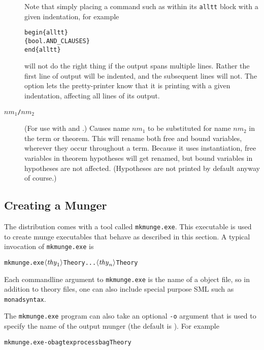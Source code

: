 \begin{description}
  Note that simply placing a command such as \holthm{} within its \texttt{alltt} block with a given indentation, for example
\begin{alltt}
   \bs{}begin\{alltt\}
      \holthm\{bool.AND_CLAUSES\}
   \bs{}end\{alltt\}
\end{alltt}
will not do the right thing if the output spans multiple lines.
%
Rather the first line of \HOL{} output will be indented, and the subsequent lines will not.
%
The \texttt{\indentoption} option lets the pretty-printer know that it is printing with a given indentation, affecting all lines of its output.


\item[$\mathit{nm}_1$\texttt{/}$\mathit{nm}_2$] (For use with \holtm{}
  and \holthm{}.)
%
Causes name $\mathit{nm}_1$ to be substituted for name $\mathit{nm}_2$ in the term or theorem.
%
This will rename both free and bound variables, wherever they occur throughout a term.
%
Because it uses instantiation, free variables in theorem hypotheses will get renamed, but bound variables in hypotheses are not affected.
%
(Hypotheses are not printed by default anyway of course.)
\end{description}


\subsection{Creating a Munger}
\label{sec:munger-creation}

\newcommand{\mkmunge}{\texttt{mkmunge.exe}}
%
The \HOL{} distribution comes with a tool called \mkmunge.
%
This executable is used to create munge executables that behave as described in this section.
%
A typical invocation of \mkmunge{} is
\begin{alltt}
   \mkmunge \(\langle\mathit{thy}\sb{1}\rangle\)Theory ... \(\langle\mathit{thy}\sb{n}\rangle\)Theory
\end{alltt}
Each commandline argument to \mkmunge{} is the name of a \HOL{} object file, so in addition to theory files, one can also include special purpose SML such as \texttt{monadsyntax}.

The \mkmunge{} program can also take an optional \texttt{-o} argument that is used to specify the name of the output munger (the default is \munge).  For example
\begin{alltt}
   \mkmunge -o bagtexprocess bagTheory
\end{alltt}

